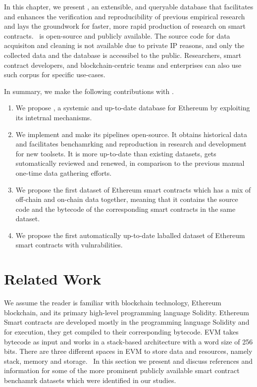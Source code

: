 	In this chapter, we present \etherbase, an extensible, and queryable database that facilitates and enhances the verification and reproducibility of previous empirical
	research and lays the groundwork for faster, more rapid production of research on smart contracts.
	\etherbase~is open-source and publicly available.
	The source code for data acquisiton and cleaning is not available due to private IP reasons, and only the collected data and the database is accessibel to the public.
	Researchers, smart contract developers, and blockchain-centric teams and enterprises can also use such corpus for specific use-cases.

	In summary, we make the following contributions with \etherbase.
	\begin{enumerate}
		\item We propose \etherbase, a systemic and up-to-date database for Ethereum by exploiting its intetrnal mechanisms.
		\item We implement \etherbase and make its pipelines open-source. It obtains historical data and facilitates benchamrking and reproduction in research and development for new toolsets. It is more up-to-date than existing datasets, gets sutomatically reviewed and renewed, in comparison to the previous manual one-time data gathering efforts.
		\item We propose the first dataset of Ethereum smart contracts which has a mix of off-chain and on-chain data together, meaning that it contains the source code and the bytecode of
		the corresponding smart contracts in the same dataset.
		\item We propose the first automatically up-to-date laballed dataset of Ethereum smart contracts with vulnrabilities.
	\end{enumerate}

\section{Related Work}
	\label{sec:relwork}
	We assume the reader is familiar with blockchain technology, Ethereum blockchain, and its primary high-level programming language Solidity.
	Ethereum Smart contracts are developed mostly in the programming language Solidity and for execution, they get compiled to their corresponding bytecode.
	EVM takes bytecode as input and works in a stack-based architecture with a word size of 256 bits.
	There are three different spaces in EVM to store data and resources, namely stack, memory and storage.~\cite{liu2019enabling}
	In this section we present and discuss references and information for some of the more prominent publicly available smart contract benchamrk datasets which were identified in our studies.

